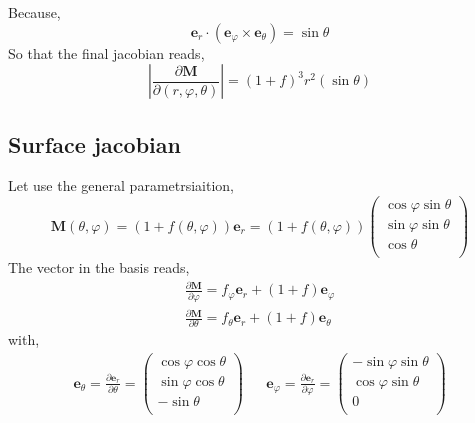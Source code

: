 Because,
\begin{equation}
    \textbf{e}_r \cdot (\textbf{e}_\varphi \times \textbf{e}_\theta)=
    \sin\theta
\end{equation}
So that the final jacobian reads, 
\begin{equation}
    |\frac{\partial \textbf{M}}{\partial (r,\varphi,\theta)}|
    =
    (1+f)^3
    r^2 
    (\sin\theta)
\end{equation}


\subsection{Surface jacobian}

Let use the general parametrsiaition, 
\begin{equation}
    \textbf{M}(\theta,\varphi)
    =
    (1 + f(\theta,\varphi)) \textbf{e}_r
    =
    (1 + f(\theta,\varphi)) 
    \begin{pmatrix}
        \cos \varphi \sin\theta\\
        \sin \varphi \sin\theta\\
        \cos\theta\\
    \end{pmatrix}
\end{equation}
The vector in the basis reads, 
\begin{align}
    \frac{\partial \textbf{M}}{\partial \varphi}
    =
    f_\varphi \textbf{e}_r
    + (1 + f) \textbf{e}_{\varphi}
    \\
    \frac{\partial \textbf{M}}{\partial \theta}
    =
    f_\theta \textbf{e}_r
    + (1 + f) \textbf{e}_{\theta}
\end{align}
with,
\begin{align}
    \textbf{e}_{\theta}
    =
    \frac{\partial \textbf{e}_r}{\partial \theta}
    = 
    \begin{pmatrix}
        \cos \varphi \cos\theta\\
        \sin \varphi \cos\theta\\
        -\sin\theta\\
    \end{pmatrix}
    &&
    \textbf{e}_{\varphi}
    =
    \frac{\partial \textbf{e}_r}{\partial \varphi}
    = 
    \begin{pmatrix}
        -\sin \varphi \sin\theta\\
        \cos \varphi \sin\theta\\
        0 \\
    \end{pmatrix}\\
\end{align}
